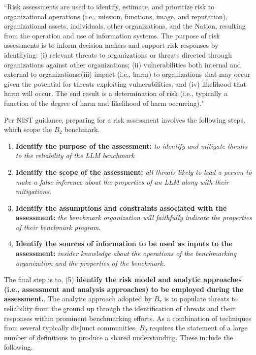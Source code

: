 \documentclass{article}
\newcommand\bb{$B_2$ }
\begin{document}
\begin{center}
    \begin{tcolorbox}[colback=gray!10, colframe=black!50, width=\textwidth, boxrule=0.5mm, sharp corners, coltext=black]
``Risk assessments are used to identify, estimate, and prioritize risk to organizational operations (i.e., mission, functions, image, and reputation), organizational assets, individuals, other organizations, and the Nation, resulting from the operation and use of information systems. The purpose of risk assessments is to inform decision makers and support risk responses by identifying: (i) relevant threats to organizations or threats directed through organizations against other organizations; (ii) vulnerabilities both internal and external to organizations;(iii) impact (i.e., harm) to organizations that may occur given the potential for threats exploiting vulnerabilities; and (iv) likelihood that harm will occur. The end result is a determination of risk (i.e., typically a function of the degree of harm and likelihood of harm occurring)."\cite{nist80030r1}
    \end{tcolorbox}
\end{center}

Per NIST guidance, preparing for a risk assessment involves the following steps, which scope the \bb benchmark.

\begin{enumerate}
    \item {\bf Identify the purpose of the assessment:} \textit{to identify and mitigate threats to the reliability of the LLM benchmark}
    \item {\bf Identify the scope of the assessment:} \textit{all threats likely to lead a person to make a false inference about the properties of an LLM along with their mitigations.}
    \item {\bf Identify the assumptions and constraints associated with the assessment:} \textit{the benchmark organization will faithfully indicate the properties of their benchmark program.}
    \item {\bf Identify the sources of information to be used as inputs to the assessment:} \textit{insider knowledge about the operations of the benchmarking organization and the properties of the benchmark.}
\end{enumerate}

The final step is to, (5) {\bf identify the risk model and analytic approaches (i.e., assessment and analysis approaches) to be employed during the assessment.}. The analytic approach adopted by \bb is to populate threats to reliability from the ground up through the identification of threats and their responses within prominent benchmarking efforts. As a combination of techniques from several typically disjunct communities, \bb requires the statement of a large number of definitions to produce a shared understanding. These include the following.
\end{document}
